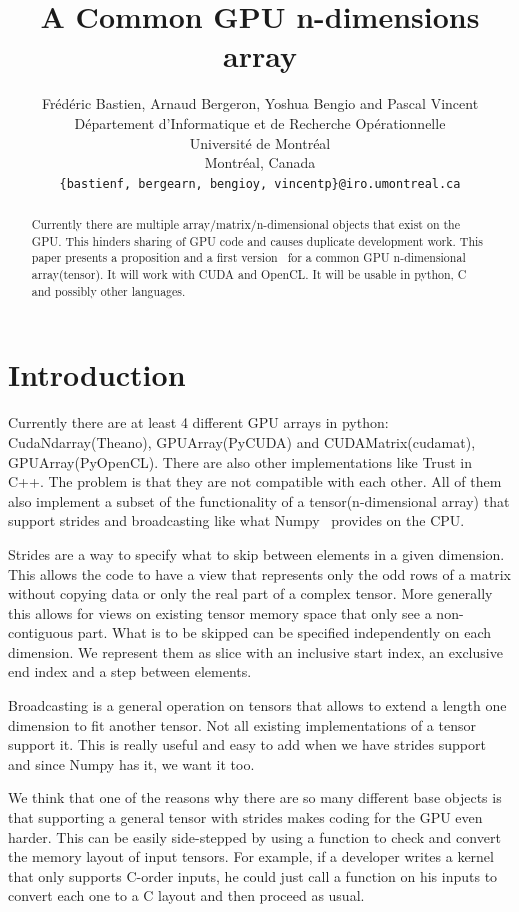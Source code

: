 \documentclass{article} %
\title{A Common GPU n-dimensions array}
\author{
Frédéric Bastien, Arnaud Bergeron, Yoshua Bengio and Pascal Vincent \\
D\'epartement d'Informatique et de Recherche Op\'erationnelle\\
Universit\'e de Montr\'eal\\
Montr\'eal, Canada \\
\texttt{\{bastienf, bergearn, bengioy, vincentp\}@iro.umontreal.ca} \\
}
\begin{document}
\maketitle

\begin{abstract}
Currently there are multiple array/matrix/n-dimensional objects
that exist on the GPU.  This hinders sharing of GPU code and causes
duplicate development work. This paper presents a proposition and a
first version~\citep{GpuNdArray} for a common GPU n-dimensional
array(tensor). It will work with CUDA and OpenCL. It will be
usable in python, C and possibly other languages.
\end{abstract}

\section{Introduction}
Currently there are at least 4 different GPU arrays in python:
CudaNdarray(Theano), GPUArray(PyCUDA) and CUDAMatrix(cudamat),
GPUArray(PyOpenCL). There are also other implementations like Trust in
C++.  The problem is that they are not compatible with each
other. All of them also implement a subset of the functionality of a
tensor(n-dimensional array) that support strides and broadcasting like
what Numpy~\citep{numpy-2007} provides on the CPU.

Strides are a way to specify what to skip between elements in a given dimension. 
This allows the code to have a view that represents only the odd rows of a matrix without copying data or only the real part of a complex tensor.
More generally this allows for views on existing tensor memory space that only see a non-contiguous part. 
What is to be skipped can be specified independently on each dimension.  
We represent them as slice with an inclusive start index, an exclusive end index and a step between elements.

Broadcasting is a general operation on tensors that allows to extend a length one dimension to fit another tensor.
Not all existing implementations of a tensor support it.
This is really useful and easy to add when we have strides support and since Numpy has it, we want it too.

We think that one of the reasons why there are so many different base objects is that supporting a general tensor with strides makes coding for the GPU even harder.
This can be easily side-stepped by using a function to check and convert the memory layout of input tensors.
For example, if a developer writes a kernel that only supports C-order inputs, he could just call a function on his inputs to convert each one to a C layout and then proceed as usual.
\end{document}
